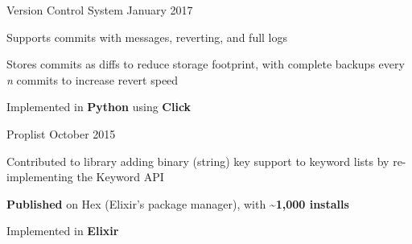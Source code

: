 \begin{cventries}
    \cventry
    {Version Control System} %
    {} %
    {}{January 2017}{
        \begin{cvitems} %
            \item {Supports commits with messages, reverting, and full logs}
            \item {Stores commits as diffs to reduce storage footprint, with complete backups every \textit{n} commits to increase revert speed}
            \item {Implemented in \textbf{Python} using \textbf{Click}}
        \end{cvitems}
    }


    \cventry
    {Proplist} %
    {} %
    {}{October 2015}{
        \begin{cvitems} %
            \item {Contributed to library adding binary (string) key support to keyword lists by re-implementing the Keyword API}
            \item {\textbf{Published} on Hex (Elixir's package manager), with \textbf{\textasciitilde1,000 installs}}
            \item {Implemented in \textbf{Elixir}}
        \end{cvitems}
    }

\end{cventries}
